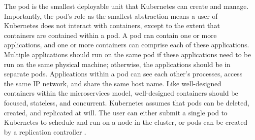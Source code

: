 The pod is the smallest deployable unit that Kubernetes can create and
manage. Importantly, the pod's role as the smallest abstraction means a user of
Kubernetes does not interact with containers, except to the extent that
containers are contained within a pod. A pod can contain one or more
applications, and one or more containers can comprise each of these applications.
Multiple applications should run on the same pod
if these applications need to be run on the same
physical machine; otherwise, the applications should be in separate pods.
Applications within a pod can see each other's processes,
access the same IP network, and share the same host name. Like well-designed
containers within the microservices model, well-designed containers should be
focused, stateless, and concurrent. Kubernetes assumes that pods can be deleted,
created, and replicated at will. The user can either submit a
single pod to Kubernetes to schedule and run on a node in the cluster, or pods
can be created by a replication controller \cite{k8s-pods}.
